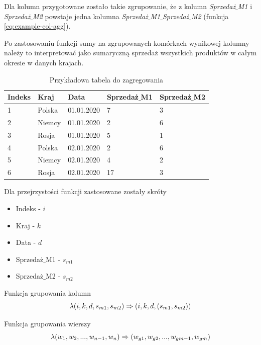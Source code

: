 \documentclass[brudnopis]{xmgr}
\begin{document}
Dla kolumn przygotowane zostało takie zgrupowanie, że z kolumn \emph{Sprzedaż$\_$M1} i \emph{Sprzedaż$\_$M2} powstaje jedna kolumna \emph{Sprzedaż$\_$M1$\_$Sprzedaż$\_$M2} (funkcja \ref{eq:example-col-agg}).
\medskip

Po zastosowaniu funkcji sumy na zgrupowanych komórkach wynikowej kolumny należy to interpretować jako sumaryczną sprzedaż wszystkich produktów w całym okresie w danych krajach.

\begin{table}[!tbh]
\begin{tabular}{|l|l|l|l|l|} \hline
Indeks & Kraj & Data & Sprzedaż$\_$M1 & Sprzedaż$\_$M2 \\ \hline
1 & Polska & 01.01.2020 & 7 & 3 \\ \hline
2 & Niemcy & 01.01.2020 & 2 & 6 \\ \hline
3 & Rosja & 01.01.2020 & 5 & 1 \\ \hline
4 & Polska & 02.01.2020 & 2 & 6 \\ \hline
5 & Niemcy & 02.01.2020 & 4 & 2 \\ \hline
6 & Rosja & 02.01.2020 & 17 & 3 \\ \hline
\end{tabular}
\caption{Przykładowa tabela do zagregowania \label{tab:example-input}}
\end{table}
\medskip

Dla przejrzystości funkcji zastosowane zostały skróty
\medskip

\begin{itemize}
    \item Indeks - $i$
    \item Kraj - $k$
    \item Data - $d$
    \item Sprzedaż$\_$M1 - $s_{m1}$
    \item Sprzedaż$\_$M2 - $s_{m2}$
\end{itemize}
\medskip

Funkcja grupowania kolumn
\begin{equation} \label{eq:example-col-agg}
\lambda (i, k, d, s_{m1}, s_{m2}) \\ \Rightarrow (i, k, d, (s_{m1}, s_{m2}))
\end{equation}
\medskip

Funkcja grupowania wierszy
\begin{equation} \label{eq:example-row-agg}
\lambda (w_1, w_2, ..., w_{n-1}, w_n) \\ \Rightarrow (w_{g1}, w_{g2}, ..., w_{gm-1}, w_{gm}) 
\end{equation}
\medskip
\end{document}
